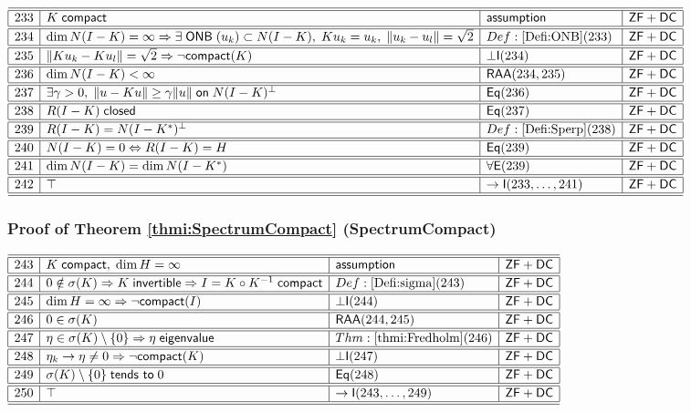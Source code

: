 \documentclass[11pt,reqno]{amsart}
\begin{document}
\noindent$%
\begin{array}{|r|l|l|l|}
\hline\hline
233 & K\;\mathsf{compact} & \mathsf{assumption} & \mathsf{ZF+DC} \\ \hline\hline
234 & \dim N(I-K)=\infty\Rightarrow\exists\;\mathsf{ONB}\;(u_{k})\subset N(I-K),\;Ku_{k}=u_{k},\;\|u_{k}-u_{l}\|=\sqrt2 & Def:\ref{Defi:ONB}(233) & \mathsf{ZF+DC} \\ \hline\hline
235 & \|Ku_{k}-Ku_{l}\|=\sqrt2\Rightarrow\neg\mathsf{compact}(K) & \bot\mathsf{I}(234) & \mathsf{ZF+DC} \\ \hline\hline
236 & \dim N(I-K)<\infty & \mathsf{RAA}(234,235) & \mathsf{ZF+DC} \\ \hline\hline
237 & \exists\gamma>0,\;\|u-Ku\|\ge\gamma\|u\|\;\mathsf{on}\;N(I-K)^{\perp} & \mathsf{Eq}(236) & \mathsf{ZF+DC} \\ \hline\hline
238 & R(I-K)\;\mathsf{closed} & \mathsf{Eq}(237) & \mathsf{ZF+DC} \\ \hline\hline
239 & R(I-K)=N(I-K^{*})^{\perp} & Def:\ref{Defi:Sperp}(238) & \mathsf{ZF+DC} \\ \hline\hline
240 & N(I-K)=0\Leftrightarrow R(I-K)=H & \mathsf{Eq}(239) & \mathsf{ZF+DC} \\ \hline\hline
241 & \dim N(I-K)=\dim N(I-K^{*}) & \forall\mathsf{E}(239) & \mathsf{ZF+DC} \\ \hline\hline
242 & \top & \to\mathsf{I}(233,\dots,241) & \mathsf{ZF+DC} \\ \hline\hline
\end{array}%
$

\medskip

\subsubsection*{Proof of Theorem \ref{thmi:SpectrumCompact} (\textsf{SpectrumCompact})}

\noindent$%
\begin{array}{|r|l|l|l|}
\hline\hline
243 & K\;\mathsf{compact},\;\dim H=\infty & \mathsf{assumption} & \mathsf{ZF+DC} \\ \hline\hline
244 & 0\notin\sigma(K)\Rightarrow K\;\mathsf{invertible}\Rightarrow I=K\circ K^{-1}\;\mathsf{compact} & Def:\ref{Defi:sigma}(243) & \mathsf{ZF+DC} \\ \hline\hline
245 & \dim H=\infty\Rightarrow\neg\mathsf{compact}(I) & \bot\mathsf{I}(244) & \mathsf{ZF+DC} \\ \hline\hline
246 & 0\in\sigma(K) & \mathsf{RAA}(244,245) & \mathsf{ZF+DC} \\ \hline\hline
247 & \eta\in\sigma(K)\setminus\{0\}\Rightarrow\eta\;\mathsf{eigenvalue} & Thm:\ref{thmi:Fredholm}(246) & \mathsf{ZF+DC} \\ \hline\hline
248 & \eta_{k}\to\eta\neq0\Rightarrow\neg\mathsf{compact}(K) & \bot\mathsf{I}(247) & \mathsf{ZF+DC} \\ \hline\hline
249 & \sigma(K)\setminus\{0\}\;\mathsf{tends\ to}\;0 & \mathsf{Eq}(248) & \mathsf{ZF+DC} \\ \hline\hline
250 & \top & \to\mathsf{I}(243,\dots,249) & \mathsf{ZF+DC} \\ \hline\hline
\end{array}%
$
\end{document}
